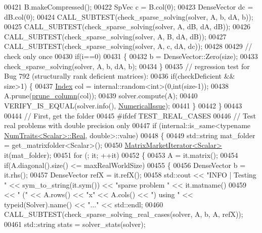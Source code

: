 \begin{DoxyCode}
00421     B.makeCompressed();
00422     SpVec c = B.col(0);
00423     DenseVector dc = dB.col(0);
00424     CALL\_SUBTEST(check\_sparse\_solving(solver, A, b,  dA, b));
00425     CALL\_SUBTEST(check\_sparse\_solving(solver, A, dB, dA, dB));
00426     CALL\_SUBTEST(check\_sparse\_solving(solver, A, B,  dA, dB));
00427     CALL\_SUBTEST(check\_sparse\_solving(solver, A, c,  dA, dc));
00428     
00429     \textcolor{comment}{// check only once}
00430     \textcolor{keywordflow}{if}(i==0)
00431     \{
00432       b = DenseVector::Zero(size);
00433       check\_sparse\_solving(solver, A, b, dA, b);
00434     \}
00435     \textcolor{comment}{// regression test for Bug 792 (structurally rank deficient matrices):}
00436     \textcolor{keywordflow}{if}(checkDeficient && size>1) \{
00437       \hyperlink{namespace_eigen_a62e77e0933482dafde8fe197d9a2cfde}{Index} col = internal::random<int>(0,int(size-1));
00438       A.prune(\hyperlink{structprune__column}{prune\_column}(col));
00439       solver.compute(A);
00440       VERIFY\_IS\_EQUAL(solver.info(), \hyperlink{group__enums_gga85fad7b87587764e5cf6b513a9e0ee5eaaf9b736d310a664e7729d163a035cc5f}{NumericalIssue});
00441     \}
00442   \}
00443   
00444   \textcolor{comment}{// First, get the folder }
00445 \textcolor{preprocessor}{#ifdef TEST\_REAL\_CASES}
00446   \textcolor{comment}{// Test real problems with double precision only}
00447   \textcolor{keywordflow}{if} (internal::is\_same<\textcolor{keyword}{typename} \hyperlink{group___core___module_struct_eigen_1_1_num_traits}{NumTraits<Scalar>::Real}, \textcolor{keywordtype}{double}>::value)
00448   \{
00449     std::string mat\_folder = get\_matrixfolder<Scalar>();
00450     \hyperlink{class_eigen_1_1_matrix_market_iterator}{MatrixMarketIterator<Scalar>} it(mat\_folder);
00451     \textcolor{keywordflow}{for} (; it; ++it)
00452     \{
00453       A = it.matrix();
00454       \textcolor{keywordflow}{if}(A.diagonal().size() <= maxRealWorldSize)
00455       \{
00456         DenseVector b = it.rhs();
00457         DenseVector refX = it.refX();
00458         std::cout << \textcolor{stringliteral}{"INFO | Testing "} << sym\_to\_string(it.sym()) << \textcolor{stringliteral}{"sparse problem "} << it.matname()
00459                   << \textcolor{stringliteral}{" ("} << A.rows() << \textcolor{stringliteral}{"x"} << A.cols() << \textcolor{stringliteral}{") using "} << \textcolor{keyword}{typeid}(Solver).name() << \textcolor{stringliteral}{"..."} <<
       std::endl;
00460         CALL\_SUBTEST(check\_sparse\_solving\_real\_cases(solver, A, b, A, refX));
00461         std::string stats = solver\_stats(solver);

\end{DoxyCode}
